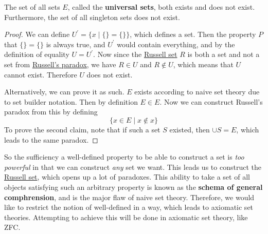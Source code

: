 \begin{corollary}
  \label{thm:universal-set}
  The set of all sets $E$, called the \textbf{universal sets}, both exists and does not exist. Furthermore, the set of all singleton sets does not exist. 
\end{corollary}
\begin{proof}
  We can define $U^\prime = \{x \mid \{\} = \{\} \}$, which defines a set. Then the property $P$ that $\{\} = \{\}$ is always true, and $U^\prime$ would contain everything, and by the definition of equality $U = U^\prime$. Now since the \hyperref[def:russell-set]{Russell set} $R$ is both a set and not a set from \hyperref[thm:russells-paradox]{Russell's paradox}, we have $R \in U$ and $R \not\in U$, which means that $U$ cannot exist. Therefore $U$ does not exist. 

  Alternatively, we can prove it as such. $E$ exists according to naive set theory due to set builder notation. Then by definition $E \in E$. Now we can construct Russell's paradox from this by defining 
  \begin{equation}
    \{ x \in E \mid x \not\in x \}
  \end{equation}
  To prove the second claim, note that if such a set $S$ existed, then $\cup S = E$, which leads to the same paradox. 
\end{proof}

So the sufficiency a well-defined property to be able to construct a set is \textit{too powerful} in that we can construct \textit{any} set we want. This leads us to construct the \hyperref[def:russell-set]{Russell set}, which opens up a lot of paradoxes. This ability to take a set of all objects satisfying such an arbitrary property is known as the \textbf{schema of general comphrension}, and is the major flaw of naive set theory. Therefore, we would like to restrict the notion of well-defined in a way, which leads to axiomatic set theories. Attempting to achieve this will be done in axiomatic set theory, like ZFC. 

